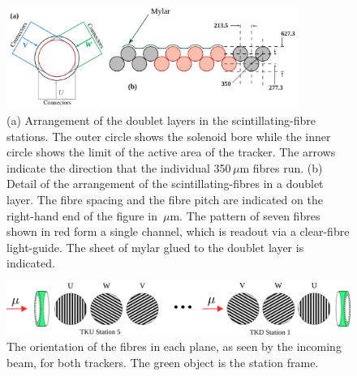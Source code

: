   \begin{figure}[tbh]
    \begin{center}
      \includegraphics[width=0.85\textwidth]{01-MICE/doublet-layer.pdf}
      \caption{\label{fig:DoubletLayer}(a) Arrangement of the doublet layers in the scintillating-fibre  stations. The outer circle shows the solenoid bore while the inner circle shows the limit of the active area of the tracker. The arrows indicate the direction that the individual 350\,$\mu$m fibres run. (b) Detail of the arrangement of the scintillating-fibres in a doublet layer. The fibre spacing and the fibre pitch are indicated on the right-hand end of the figure in \,$\mu$m. The pattern of seven fibres shown in red form a single channel, which is readout via a clear-fibre light-guide. The sheet of mylar glued to the doublet layer is indicated. }
    \end{center}
  \end{figure}

  \begin{figure}[tbh]
    \centering
    \includegraphics[width=0.95\linewidth]{01-MICE/FibrePlaneOrientation.pdf} \hspace{2pc}%
    \caption{\label{fig:FibrePlaneOrientation} The orientation of the fibres in each plane, as seen by the incoming beam, for both trackers. The green object is the station frame.}
  \end{figure}